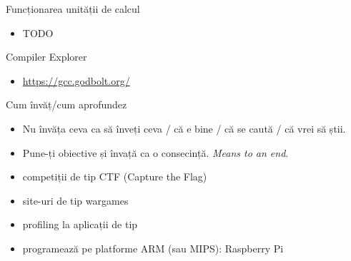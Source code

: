 \documentclass{beamer}
\begin{document}
\begin{frame}{Funcționarea unității de calcul}
  \begin{itemize}
    \item TODO
  \end{itemize}
\end{frame}

\begin{frame}{Compiler Explorer}
  \begin{itemize}
    \item \url{https://gcc.godbolt.org/}
  \end{itemize}
\end{frame}



\begin{frame}{Cum învăț/cum aprofundez}
  \begin{itemize}
    \pause \item Nu învăța ceva ca să înveți ceva / că e bine / că se caută / că vrei să știi.
    \pause \item Pune-ți obiective și învață ca o consecință. \textit{Means to an end}.
    \item competiții de tip CTF (Capture the Flag)
    \item site-uri de tip wargames
    \item profiling la aplicații de tip
    \item programează pe platforme ARM (sau MIPS): Raspberry Pi
  \end{itemize}
\end{frame}
\end{document}
